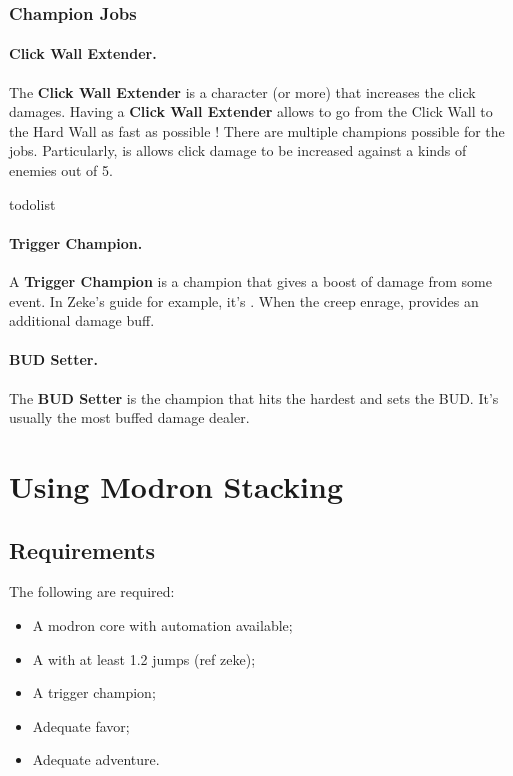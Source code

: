 \documentclass{article}
\begin{document}
\subsubsection{Champion Jobs}

\paragraph{Click Wall Extender.}
\label{sec:clickWallExtender}

The \textbf{Click Wall Extender} is a character (or more) that increases the click damages.
Having a \textbf{Click Wall Extender} allows to go from the Click Wall to the Hard Wall as fast as possible !
There are multiple champions possible for the jobs.
Particularly, \minsc is allows click damage to be increased against a kinds of enemies out of 5.

todolist

\paragraph{Trigger Champion.}

A \textbf{Trigger Champion} is a champion that gives a boost of damage from some event.
In Zeke's guide for example, it's \dragonbait.
When the creep enrage, \dragonbait provides an additional damage buff.

\paragraph{BUD Setter.}

The \textbf{BUD Setter} is the champion that hits the hardest and sets the BUD.
It's usually the most buffed damage dealer.


\section{Using Modron \briv Stacking}

\subsection{Requirements}

The following are required:
\begin{itemize}
    \item A modron core with automation available;
    \item A \briv with at least 1.2 jumps (ref zeke);
    \item A trigger champion;
    \item Adequate favor;
    \item Adequate adventure.
\end{itemize}
\end{document}
